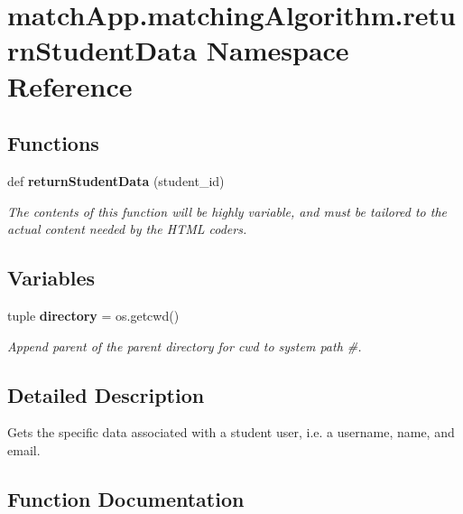 \section{match\+App.\+matching\+Algorithm.\+return\+Student\+Data Namespace Reference}
\label{namespacematch_app_1_1matching_algorithm_1_1return_student_data}
\subsection*{Functions}
\begin{DoxyCompactItemize}
\item 
def {\bf return\+Student\+Data} (student\+\_\+id)
\begin{DoxyCompactList}\small\item\em The contents of this function will be highly variable, and must be tailored to the actual content needed by the H\+T\+M\+L coders. \end{DoxyCompactList}\end{DoxyCompactItemize}
\subsection*{Variables}
\begin{DoxyCompactItemize}
\item 
tuple {\bf directory} = os.\+getcwd()
\begin{DoxyCompactList}\small\item\em Append parent of the parent directory for cwd to system path \#. \end{DoxyCompactList}\end{DoxyCompactItemize}


\subsection{Detailed Description}
\begin{DoxyVerb}Gets the specific data associated with a student user, i.e. a username, name, and email. 
\end{DoxyVerb}
 

\subsection{Function Documentation}
